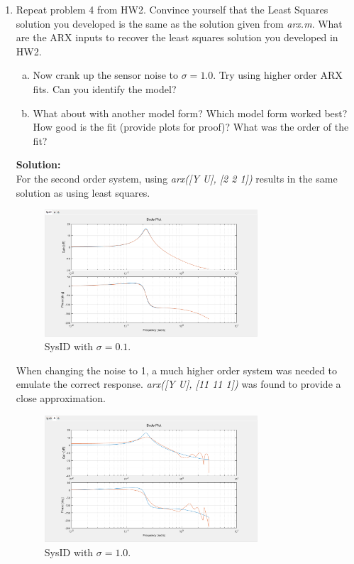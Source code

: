 \documentclass[10pt]{article}
\newcommand{\solution}{\textbf{Solution: \\}}
\begin{document}
\begin{enumerate}[label=\textbf{\arabic*.}]
  \item Repeat problem 4 from HW2. Convince yourself that the Least Squares 
  solution you developed is the same as the solution given from \emph{arx.m}. 
  What are the ARX inputs to recover the least squares solution you developed 
  in HW2.
  \begin{enumerate}[(a)]
    \item Now crank up the sensor noise to $\sigma=1.0$. Try using higher order 
    ARX fits. Can you identify the model?
    \item What about with another model form? Which model form worked best? How 
    good is the fit (provide plots for proof)? What was the order of the fit?
  \end{enumerate}
  \solution
  For the second order system, using \emph{arx([Y U], [2 2 1])} results in the 
  same solution as using least squares.
  \begin{figure}[H]
    \centering
    \includegraphics[width=0.75\textwidth]{p2_sysid.png}
    \caption{SysID with $\sigma=0.1$.}
    \label{fig:4}
  \end{figure}
  When changing the noise to 1, a much higher order system was needed to emulate 
  the correct response. \emph{arx([Y U], [11 11 1])} was found to provide a 
  close approximation.
  \begin{figure}[H]
    \centering
    \includegraphics[width=0.75\textwidth]{p2_a.png}
    \caption{SysID with $\sigma=1.0$.}
    \label{fig:5}
  \end{figure}

\end{enumerate} 
\end{document}
